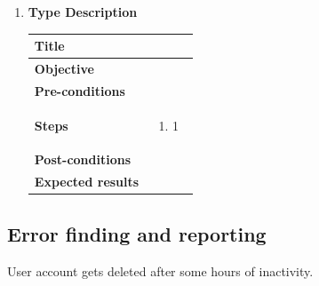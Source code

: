 \documentclass[UKenglish,12pt]{article}
\begin{document}
\begin{enumerate}
\item
\textbf{\hspace{0.3cm}Type\hspace{4.4cm} Description}
\newline \vspace{0.2cm}
\begin{tabular}{| p{5cm} | p{10cm} | }
	\hline
	 \textbf{Title} & \\ \hline
	 \textbf{Objective} & \\ \hline
	 \textbf{Pre-conditions} & \\ \hline
	 \textbf{Steps} & \begin{enumerate} \item 1 \end{enumerate} \\ \hline
	 \textbf{Post-conditions} & \\ \hline
	 \textbf{Expected results} & \\ 
	 \hline
\end{tabular} %




\end{enumerate}

\subsection{Error finding and reporting}
User account gets deleted after some hours of inactivity.
\end{document}
